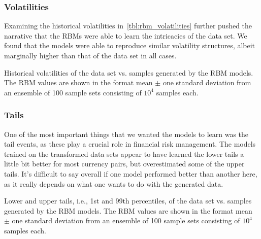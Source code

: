\subsubsection{Volatilities}
Examining the historical volatilities in~\cref{tbl:rbm_volatilities} further pushed the narrative that the RBMs were able to learn the intricacies of the data set.
We found that the models were able to reproduce similar volatility structures, albeit marginally higher than that of the data set in all cases.
\begin{table}[!htb]
    \centering
    \begin{adjustbox}{max width=\textwidth}
        
    \end{adjustbox}
    \caption{Historical volatilities of the data set vs. samples generated by the RBM models. The RBM values are shown in the format mean \(\pm\) one standard deviation from an ensemble of 100 sample sets consisting of \( 10^4 \) samples each.}
    \label{tbl:rbm_volatilities}
\end{table}

\subsubsection{Tails}
One of the most important things that we wanted the models to learn was the tail events, as these play a crucial role in financial risk management.
The models trained on the transformed data sets appear to have learned the lower tails a little bit better for most currency pairs, but overestimated some of the upper tails.
It's difficult to say overall if one model performed better than another here, as it really depends on what one wants to do with the generated data.
\begin{table}[!htb]
    \centering
    \begin{adjustbox}{max width=\textwidth}
        
    \end{adjustbox}
    \caption{Lower and upper tails, i.e., 1st and 99th percentiles, of the data set vs. samples generated by the RBM models. The RBM values are shown in the format mean \(\pm\) one standard deviation from an ensemble of 100 sample sets consisting of \( 10^4 \) samples each.}
    \label{tbl:rbm_tails}
\end{table}

